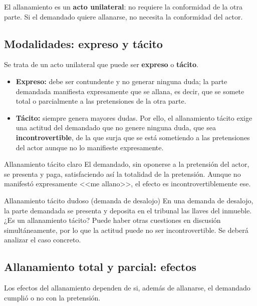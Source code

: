 \documentclass[12pt,oneside]{book}
\begin{document}
El allanamiento es un \textbf{acto unilateral}: no requiere la conformidad de la otra parte. Si el demandado quiere allanarse, no necesita la conformidad del actor.

\subsection{Modalidades: expreso y tácito}

Se trata de un acto unilateral que puede ser \textbf{expreso} o \textbf{tácito}.

\begin{itemize}
    \item \textbf{Expreso:} debe ser contundente y no generar ninguna duda; la parte demandada manifiesta expresamente que se allana, es decir, que se somete total o parcialmente a las pretensiones de la otra parte.
    \item \textbf{Tácito:} siempre genera mayores dudas. Por ello, el allanamiento tácito exige una actitud del demandado que no genere ninguna duda, que sea \textbf{incontrovertible}, de la que surja que se está sometiendo a las pretensiones del actor aunque no lo manifieste expresamente.
\end{itemize}

\begin{example}{Allanamiento tácito claro}
El demandado, sin oponerse a la pretensión del actor, se presenta y paga, satisfaciendo así la totalidad de la pretensión. Aunque no manifestó expresamente <<me allano>>, el efecto es incontrovertiblemente ese.
\end{example}

\begin{example}{Allanamiento tácito dudoso (demanda de desalojo)}
En una demanda de desalojo, la parte demandada se presenta y deposita en el tribunal las llaves del inmueble. ¿Es un allanamiento tácito? Puede haber otras cuestiones en discusión simultáneamente, por lo que la actitud puede no ser incontrovertible. Se deberá analizar el caso concreto.
\end{example}

\subsection{Allanamiento total y parcial: efectos}

Los efectos del allanamiento dependen de si, además de allanarse, el demandado cumplió o no con la pretensión.
\end{document}

